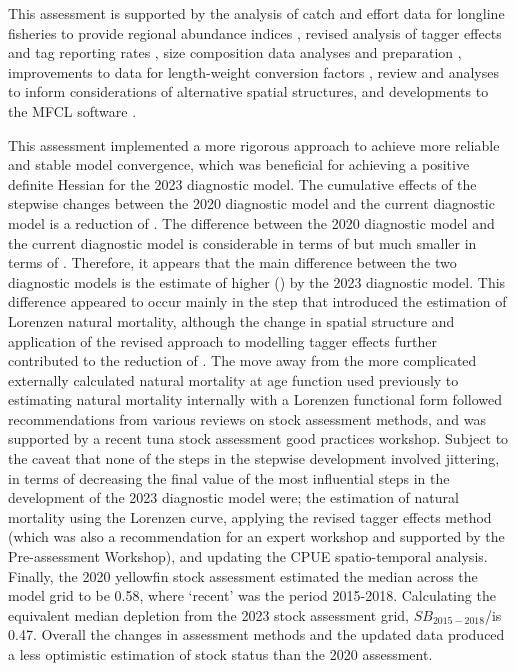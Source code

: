 This assessment is supported by the analysis of catch and effort data for longline fisheries to provide regional abundance indices \citep{teears_cpue_2023}, revised analysis of tagger effects and tag reporting rates \citep{peatman_analysis_2023-1,peatman_analysis_2023-2}, size composition data analyses and preparation \citep{peatman_analysis_2023}, improvements to data for length-weight conversion factors \citep{macdonald_project_2023}, review and analyses to inform considerations of alternative spatial structures, and developments to the MFCL software \citep{davies_developments_2023}.

This assessment implemented a more rigorous approach to achieve more reliable and stable model convergence, which was beneficial for achieving a positive definite Hessian for the 2023 diagnostic model. The cumulative effects of the stepwise changes between the 2020 diagnostic model and the current diagnostic model is a reduction of \sbsbfo. The difference between the 2020 diagnostic model and the current diagnostic model is considerable in terms of \sbsbfo but much smaller in terms of \sb. Therefore, it appears that the main difference between the two diagnostic models is the estimate of higher (\sbfo) by the 2023 diagnostic model. This difference appeared to occur mainly in the step that introduced the estimation of Lorenzen natural mortality, although the change in spatial structure and application of the revised approach to modelling tagger effects further contributed to the reduction of \sbsbfo. The move away from the more complicated externally calculated natural mortality at age function used previously to estimating natural mortality internally with a Lorenzen functional form followed recommendations from various reviews on stock assessment methods, and was supported by a recent tuna stock assessment good practices workshop. Subject to the caveat that none of the steps in the stepwise development involved jittering, in terms of decreasing the final value of \sbsbfo the most influential steps in the development of the 2023 diagnostic model were; the estimation of natural mortality using the Lorenzen curve, applying the revised tagger effects method (which was also a recommendation for an expert workshop and supported by the Pre-assessment Workshop), and updating the CPUE spatio-temporal analysis. Finally, the 2020 yellowfin stock assessment estimated the median \sbrsbfo across the model grid to be 0.58, where `recent' was the period 2015-2018. Calculating the equivalent median depletion from the 2023 stock assessment grid, $\mathit{SB}_{2015-2018}$/\sbfo is 0.47. Overall the changes in assessment methods and the updated data produced a less optimistic estimation of stock status than the 2020 assessment.


